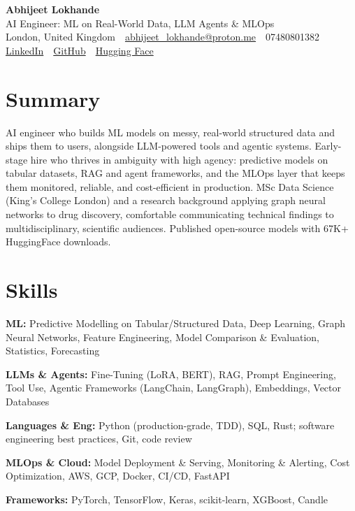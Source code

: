 \documentclass[10pt,a4paper]{article}
\newcommand{\sep}{\,\textcolor{accent!60}{\textbar}\,}
\begin{document}
\begin{center}
  {\fontsize{24}{26}\selectfont\bfseries Abhijeet Lokhande}\\[3pt]
  {\color{accent}\large AI Engineer: ML on Real-World Data, LLM Agents \& MLOps}\\[5pt]
  {\small
    London, United Kingdom \sep
    \href{mailto:abhijeet_lokhande@proton.me}{abhijeet\_lokhande@proton.me} \sep
    07480801382 \\[2pt]
    \href{https://www.linkedin.com/in/ablds/}{LinkedIn} \sep
    \href{https://github.com/abhijeetscode}{GitHub} \sep
    \href{https://huggingface.co/ab-ai}{Hugging Face}
  }
\end{center}
\vspace{2pt}

\section{Summary}
AI engineer who builds ML models on messy, real-world structured data and ships them to users, alongside LLM-powered tools and agentic systems. Early-stage hire who thrives in ambiguity with high agency: predictive models on tabular datasets, RAG and agent frameworks, and the MLOps layer that keeps them monitored, reliable, and cost-efficient in production. MSc Data Science (King's College London) and a research background applying graph neural networks to drug discovery, comfortable communicating technical findings to multidisciplinary, scientific audiences. Published open-source models with 67K+ HuggingFace downloads.

\section{Skills}
\begin{tight}
  \item[\textcolor{accent}{\small$\bullet$}] \textbf{ML:} Predictive Modelling on Tabular/Structured Data, Deep Learning, Graph Neural Networks, Feature Engineering, Model Comparison \& Evaluation, Statistics, Forecasting
  \item[\textcolor{accent}{\small$\bullet$}] \textbf{LLMs \& Agents:} Fine-Tuning (LoRA, BERT), RAG, Prompt Engineering, Tool Use, Agentic Frameworks (LangChain, LangGraph), Embeddings, Vector Databases
  \item[\textcolor{accent}{\small$\bullet$}] \textbf{Languages \& Eng:} Python (production-grade, TDD), SQL, Rust; software engineering best practices, Git, code review
  \item[\textcolor{accent}{\small$\bullet$}] \textbf{MLOps \& Cloud:} Model Deployment \& Serving, Monitoring \& Alerting, Cost Optimization, AWS, GCP, Docker, CI/CD, FastAPI
  \item[\textcolor{accent}{\small$\bullet$}] \textbf{Frameworks:} PyTorch, TensorFlow, Keras, scikit-learn, XGBoost, Candle
\end{tight}
\end{document}
